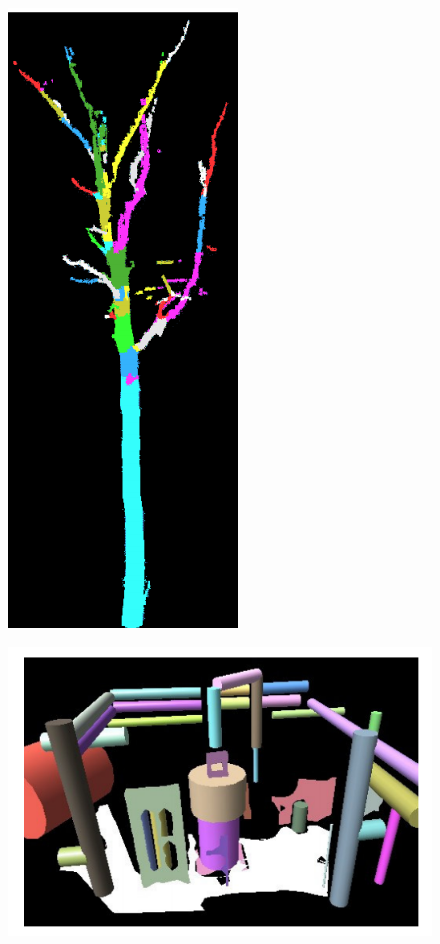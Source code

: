 \documentclass[runningheads,a4paper]{llncs}
\begin{document}
\begin{figure}
\begin{minipage}{.5\textwidth}
  \centering
  \includegraphics[width=.3\linewidth]{The_existing_segmentation.png}
  \label{fig:simple tree recognition}
\end{minipage}
\begin{minipage}{.5\textwidth}
  \centering
  \includegraphics[width=1\linewidth]{Cylinders_and_planes.png}
  \label{fig:segmentation}
\end{minipage}
\end{figure}
\end{document}
